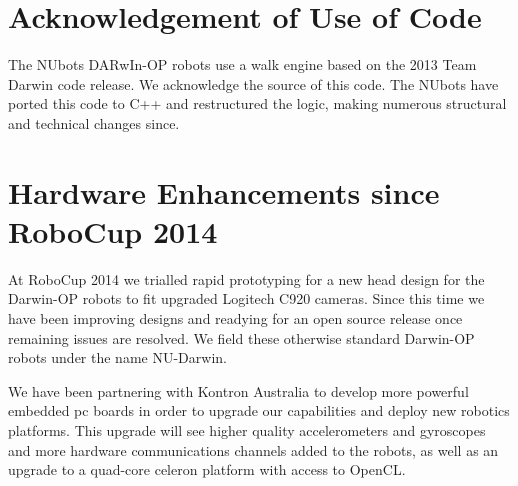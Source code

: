 \documentclass{llncs}
\begin{document}


\section{Acknowledgement of Use of Code}
The NUbots DARwIn-OP robots use a walk engine based on the 2013 Team Darwin code release. We acknowledge the source of this code. The NUbots have ported this code to C++ and restructured the logic, making numerous structural and technical changes since. %

\section{Hardware Enhancements since RoboCup 2014}
At RoboCup 2014 we trialled rapid prototyping for a new head design for the Darwin-OP robots to fit upgraded Logitech C920 cameras. Since this time we have been improving designs and readying for an open source release once remaining issues are resolved. We field these otherwise standard Darwin-OP robots under the name NU-Darwin.

We have been partnering with Kontron Australia to develop more powerful embedded pc boards in order to upgrade our capabilities and deploy new robotics platforms. This upgrade will see higher quality accelerometers and gyroscopes and more hardware communications channels added to the robots, as well as an upgrade to a quad-core celeron platform with access to OpenCL.


\end{document}
